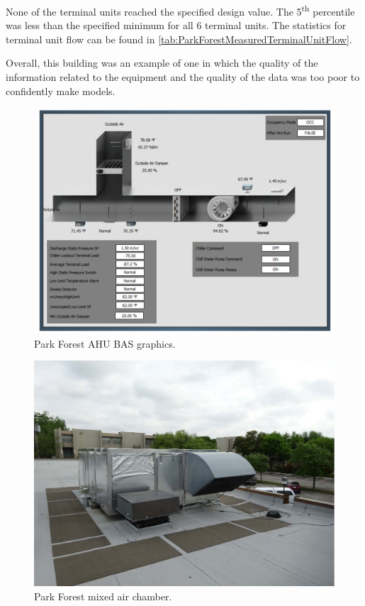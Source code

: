 None of the terminal units reached the specified design value. The
5\textsuperscript{th} percentile was less than the specified minimum for
all 6 terminal units. The statistics for terminal unit flow can be found in 
\tableref{} \ref{tab:ParkForestMeasuredTerminalUnitFlow}. 

Overall, this building was an example of one in which the quality of the
information related to the equipment and the quality of the data was
too poor to confidently make models.

\begin{figure}
\centering
\includegraphics[width=\textwidth]{Images/ParkForestAHUGraphic.PNG}
\caption{Park Forest AHU BAS graphics.}
\label{fig:ParkForestAHUGraphic}
\end{figure}

\begin{figure}
\centering
\includegraphics[width=\textwidth]{Images/ParkForestMixedAirChamber.PNG}
\caption{Park Forest mixed air chamber.}
\label{fig:ParkForestMixedAirChamber}
\end{figure}


